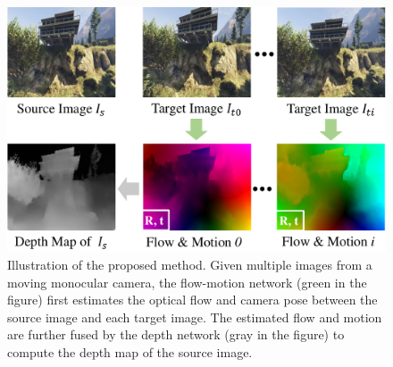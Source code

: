 \documentclass[letterpaper, 10 pt, conference]{ieeeconf}  %
\begin{document}
\begin{figure}[t]
   
\begin{center}
       
\includegraphics[width=1.0\linewidth]{figs/multiview.pdf}
   
\end{center}
   
\vspace{-0.4cm}
   
\caption{Illustration of the proposed method. Given multiple images from a moving monocular camera, the flow-motion network (green in the figure) first estimates the optical flow and camera pose between the source image and each target image. The estimated flow and motion are further fused by the depth network (gray in the figure) to compute the depth map of the source image.}
   
\vspace{-0.6cm}
   
\label{fig:multiview_example}
\end{figure}
 
\end{document}
